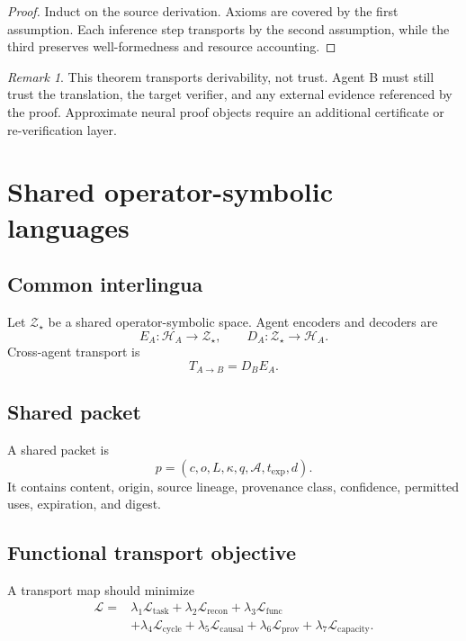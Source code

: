 \documentclass[11pt]{article}
\theoremstyle{definition}
\theoremstyle{remark}
\newtheorem{remark}[theorem]{Remark}
\newcommand{\Lat}{\mathcal H}
\newcommand{\Shared}{\mathcal Z_\star}
\begin{document}
\begin{proof}
Induct on the source derivation. Axioms are covered by the first assumption. Each inference step transports by the second assumption, while the third preserves well-formedness and resource accounting.
\end{proof}

\begin{remark}
This theorem transports derivability, not trust. Agent B must still trust the translation, the target verifier, and any external evidence referenced by the proof. Approximate neural proof objects require an additional certificate or re-verification layer.
\end{remark}

\section{Shared operator-symbolic languages}

\subsection{Common interlingua}

Let \(\Shared\) be a shared operator-symbolic space. Agent encoders and decoders are
\[
E_A:\Lat_A\to\Shared,
\qquad
D_A:\Shared\to\Lat_A.
\]
Cross-agent transport is
\[
T_{A\to B}=D_BE_A.
\]

\subsection{Shared packet}

A shared packet is
\[
p=(c,o,L,\kappa,q,\mathcal A,t_{\mathrm{exp}},d).
\]
It contains content, origin, source lineage, provenance class, confidence, permitted uses, expiration, and digest.

\subsection{Functional transport objective}

A transport map should minimize
\[
\begin{aligned}
\mathcal L={}&
\lambda_1\mathcal L_{\mathrm{task}}
+\lambda_2\mathcal L_{\mathrm{recon}}
+\lambda_3\mathcal L_{\mathrm{func}}\\
&+\lambda_4\mathcal L_{\mathrm{cycle}}
+\lambda_5\mathcal L_{\mathrm{causal}}
+\lambda_6\mathcal L_{\mathrm{prov}}
+\lambda_7\mathcal L_{\mathrm{capacity}}.
\end{aligned}
\]
\end{document}
